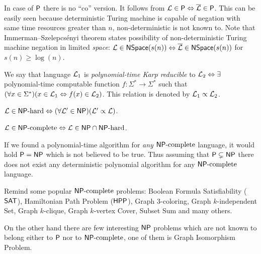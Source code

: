 		\begin{remark}
			In case of $\P$ there is no ``co'' version. It follows from ${\cal L} \in \P \iff \overline{\cal L} \in \P$. This can be easily seen because deterministic Turing machine is capable of negation with same time resources greater than $n$, non-deterministic is not known to. Note that Immerman--Szelepcsényi theorem states possibility of non-deterministic Turing machine negation in limited {\em space}: ${\cal L} \in \NSpace(s(n)) \iff \overline{\cal L} \in \NSpace(s(n))$ for $s(n) \geq \log(n)$.
		\end{remark}
		
		\begin{defn}
			We say that language ${\cal L}_1$ is {\em polynomial-time Karp reducible} to ${\cal L}_2 \iff \exists$ polynomial-time computable function $f:\Sigma^*\rightarrow\Sigma^*$ such that $(\forall x\in\Sigma^*)(x\in{\cal L}_1\iff f(x)\in{\cal L}_2)$. This relation is denoted by ${\cal L}_1\propto{\cal L}_2$.
		\end{defn}
		
		\begin{defn}
			${\cal L}\in\NPH \iff (\forall{\cal L'}\in\NP)({\cal L'}\propto{\cal L})$.
		\end{defn}
		
		\begin{defn}
			${\cal L}\in\NPC\iff{\cal L}\in\NP\cap\NPH$.
		\end{defn}
		
		\begin{note}
			If we found a polynomial-time algorithm for {\em any} $\NPC$ language, it would hold $\P=\NP$ which is not believed to be true. Thus assuming that $\P\subsetneq\NP$ there does not exist any deterministic polynomial algorithm for any $\NPC$ language.
		\end{note}
		
		\begin{example}\label{exm:npc}
			Remind some popular $\NPC$ problems: Boolean Formula Satisfiability ($\sf SAT$), Hamiltonian Path Problem ($\sf HPP$), Graph $3$-coloring, Graph $k$-independent Set, Graph $k$-clique, Graph $k$-vertex Cover, Subset Sum and many others.
			
			On the other hand there are few interesting $\NP$ problems which are not known to belong either to $\P$ nor to $\NPC$, one of them is Graph Isomorphism Problem.
		\end{example}
		
		
